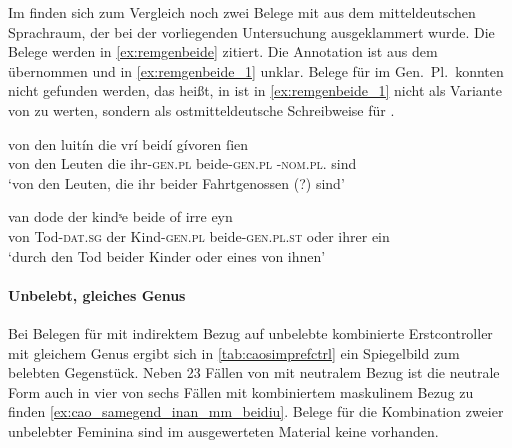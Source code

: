 Im \REM{} finden sich zum Vergleich noch zwei Belege mit  aus
dem mitteldeutschen Sprachraum, der bei der vorliegenden Untersuchung
ausgeklammert wurde. Die Belege werden in \cref{ex:remgenbeide} zitiert. Die
Annotation ist aus dem \REM{} übernommen und in \cref{ex:remgenbeide_1}
unklar. Belege für  im Gen.\ Pl.\ konnten nicht gefunden werden,
das heißt,  in  ist in \cref{ex:remgenbeide_1} nicht
als Variante von  zu werten, sondern als ostmitteldeutsche
Schreibweise für  \autocites[52--53]{paul2007}[305]{ksw2}.

\begin{exe}
\ex \label{ex:remgenbeide}
\begin{xlist}
	\ex \label{ex:remgenbeide_1}
		\gll von den luitín die vrí beidí gívoren ſien \\
			von den Leuten die ihr-\textsc{gen.pl} beide-\textsc{gen.pl}
			-\textsc{nom.pl.\MascA} sind
			\\
		\trans `von den Leuten, die ihr beider Fahrtgenossen (?) sind'
			\parencites(; Nordhausen, Stadtarchiv,
				Ms. II, Na 6%
				)[M320: 17v,21--22]{rem}

	\ex \label{ex:remgenbeide_2}
		\gll van dode der kindˢe beide of irre eyn \\
			von Tod-\textsc{dat.sg} der Kind-\textsc{gen.pl} beide-\textsc{gen.pl.st} oder
			ihrer ein \\
		\trans `durch den Tod beider Kinder oder eines von ihnen'
			\parencites(Köln, Historisches Archiv der Stadt, Best.~210 \mkbibparens{Domstift}, U~3/759, 01.09.1306)[M350: 5,11]{rem}
\end{xlist}
\end{exe}

\paragraph{Unbelebt, gleiches Genus}

Bei Belegen für  mit indirektem Bezug auf unbelebte kombinierte
Erstcontroller mit gleichem Genus ergibt sich in \cref{tab:caosimprefctrl} ein
Spiegelbild zum belebten Gegenstück. Neben 23 Fällen von  mit
neutralem Bezug ist die neutrale Form auch in vier von sechs Fällen mit
kombiniertem maskulinem Bezug zu finden \cref{ex:cao_samegend_inan_mm_beidiu}.
Belege für die Kombination zweier unbelebter Feminina sind im ausgewerteten
Material keine vorhanden.

